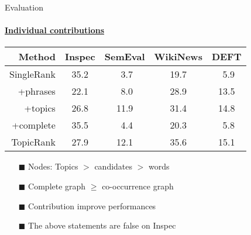   \begin{frame}[label=contributions_evaluation]{Evaluation}
    \framesubtitle{\hyperlink{contributions_evaluation_backup}{Individual contributions}}
    
    \begin{center}
      \begin{tabular}{rcccc}
        \toprule
        \textbf{Method} & \textbf{Inspec} & \textbf{SemEval} & \textbf{WikiNews} & \textbf{DEFT}\\
        \midrule
        SingleRank & 35.2 & $~~$3.7 & 19.7 & $~~$5.9\\
        \midrule
        +phrases & 22.1 & $~~$8.0 & 28.9 & 13.5\\
        +topics & 26.8 & 11.9 & 31.4 & 14.8\\
        +complete & 35.5 & $~~$4.4 & 20.3 & $~~$5.8\\
        \midrule
        TopicRank & 27.9 & 12.1 & 35.6 & 15.1\\
        \bottomrule
      \end{tabular}
    \end{center}

    \begin{itemize}
      \item[\footnotesize\color{green}$\blacksquare$]{Nodes: Topics $>$
                                                      candidates $>$ words}
      \item[\footnotesize\color{green}$\blacksquare$]{Complete graph $\geq$
                                                      co-occurrence graph}
      \item[\footnotesize\color{green}$\blacksquare$]{Contribution improve
                                                      performances}
      \item[\footnotesize\color{red}$\blacksquare$]{The above statements are
                                                    false on Inspec}
    \end{itemize}
  \end{frame}

